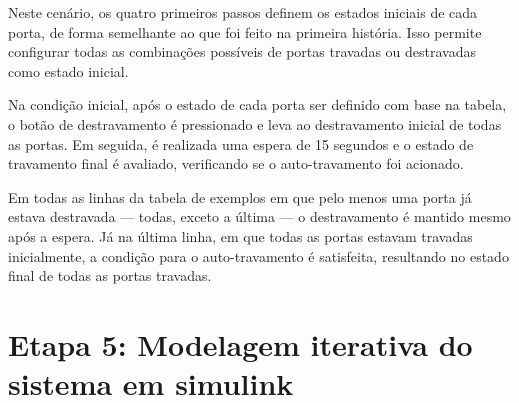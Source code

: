 Neste cenário, os quatro primeiros passos definem os estados iniciais de cada porta, de forma semelhante ao que foi feito na primeira história. Isso permite configurar 
todas as combinações possíveis de portas travadas ou destravadas como estado inicial.

Na condição inicial, após o estado de cada porta ser definido com base na tabela, o botão de destravamento é pressionado e leva ao destravamento inicial de todas as 
portas. Em seguida, é realizada uma espera de 15 segundos e o estado de travamento final é avaliado,  verificando se o auto-travamento foi acionado.

Em todas as linhas da tabela de exemplos em que pelo menos uma porta já estava destravada — todas, exceto a última — o destravamento é mantido mesmo após a espera. 
Já na última linha, em que todas as portas estavam travadas inicialmente, a condição para o auto-travamento é satisfeita, resultando no estado final de todas as 
portas travadas.


\section{Etapa 5: Modelagem iterativa do sistema em simulink}



